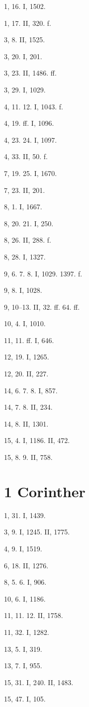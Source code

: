 1, 16. I, 1502.

1, 17. II, 320. f.

3, 8. II, 1525.

3, 20. I, 201.

3, 23. II, 1486. ff.

3, 29. I, 1029.

4, 11. 12. I, 1043. f.

4, 19. ff. I, 1096.

4, 23. 24. I, 1097.

4, 33. II, 50. f.

7, 19. 25. I, 1670.

7, 23. II, 201.

8, 1. I, 1667.

8, 20. 21. I, 250.

8, 26. II, 288. f.

8, 28. I, 1327.

9, 6. 7. 8. I, 1029. 1397. f.

9, 8. I, 1028.

9, 10–13. II, 32. ff. 64. ff.

10, 4. I, 1010.

11, 11. ff. I, 646.

12, 19. I, 1265.

12, 20. II, 227.

14, 6. 7. 8. I, 857.

14, 7. 8. II, 234.

14, 8. II, 1301.

15, 4. I, 1186. II, 472.

15, 8. 9. II, 758.

\section{1 Corinther}

1, 31. I, 1439.

3, 9. I, 1245. II, 1775.

4, 9. I, 1519.

6, 18. II, 1276.

8, 5. 6. I, 906.

10, 6. I, 1186.

11, 11. 12. II, 1758.

11, 32. I, 1282.

13, 5. I, 319.

13, 7. I, 955.

15, 31. I, 240. II, 1483.

15, 47. I, 105.

